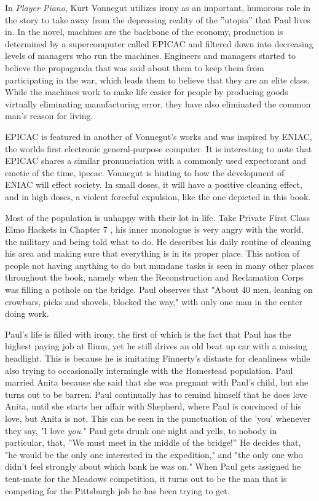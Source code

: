 In {\it Player Piano}, Kurt Vonnegut utilizes irony as an important, humorous role in the story to take away from the depressing reality of the ''utopia'' that Paul lives in.
In the novel, machines are the backbone of the economy, production is determined by a supercomputer called EPICAC and filtered down into decreasing levels of managers who run the machines. 
Engineers and managers started to believe the propaganda that was said about them to keep them from participating in the war, \autocite[62]{kurt1} which leads them to believe that they are an elite class.
While the machines work to make life easier for people by producing goods virtually eliminating manufacturing error, they have also eliminated the common man's reason for living.

EPICAC is featured in another of Vonnegut's works and was inspired by ENIAC, the worlds first electronic general-purpose computer.
It is interesting to note that EPICAC shares a similar pronunciation with a commonly used expectorant and emetic of the time, ipecac.
Vonnegut is hinting to how the development of ENIAC will effect society.
In small doses, it will have a positive cleaning effect, and in high doses, a violent forceful expulsion, like the one depicted in this book. 

Most of the population is unhappy with their lot in life.
Take Private First Class Elmo Hackets in Chapter 7 \autocite[47--49]{kurt1}, his inner monologue is very angry with the world, the military and being told what to do.
He describes his daily routine of cleaning his area and making sure that everything is in its proper place.
This notion of people not having anything to do but mundane tasks is seen in many other places throughout the book, namely when the Reconstruction and Reclamation Corps was filling a pothole on the bridge.
Paul observes that "About 40 men, leaning on crowbars, picks and shovels, blocked the way," with only one man in the center doing work. \autocite[25]{kurt1}

Paul's life is filled with irony, the first of which is the fact that Paul has the highest paying job at Ilium, yet he still drives an old beat up car with a missing headlight.
This is because he is imitating Finnerty's distaste for cleanliness while also trying to occasionally intermingle with the Homestead population. Paul married Anita because she said that she was pregnant with Paul's child, but she turns out to be barren.
Paul continually has to remind himself that he does love Anita, until she starts her affair with Shepherd, where Paul is convinced of his love, but Anita is not.
This can be seen in the punctuation of the 'you' whenever they say, "I love \textit{you}."
Paul gets drunk one night and yells, to nobody in particular, that, ''We must meet in the middle of the bridge!'' 
He decides that, "he would be the only one interested in the expedition," and "the only one who didn't feel strongly about which bank he was on." \autocite[73]{kurt1}
When Paul gets assigned he tent-mate for the Meadows competition, it turns out to be the man that is competing for the Pittsburgh job he has been trying to get.

